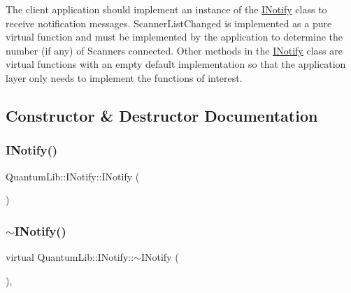 The client application should implement an instance of the \mbox{\hyperlink{class_quantum_lib_1_1_i_notify}{I\+Notify}} class to receive notification messages. Scanner\+List\+Changed is implemented as a pure virtual function and must be implemented by the application to determine the number (if any) of Scanners connected. Other methods in the \mbox{\hyperlink{class_quantum_lib_1_1_i_notify}{I\+Notify}} class are virtual functions with an empty default implementation so that the application layer only needs to implement the functions of interest. 

\subsection{Constructor \& Destructor Documentation}
\mbox{\label{class_quantum_lib_1_1_i_notify_a8605cda14fb993a16484d428d4361d00}} 
\subsubsection{\texorpdfstring{I\+Notify()}{INotify()}}
{\footnotesize\ttfamily Quantum\+Lib\+::\+I\+Notify\+::\+I\+Notify (\begin{DoxyParamCaption}{ }\end{DoxyParamCaption})\hspace{0.3cm}{\ttfamily [inline]}}

\mbox{\label{class_quantum_lib_1_1_i_notify_a9f00b489e5d31a80e63801166bb13e3e}} 
\subsubsection{\texorpdfstring{$\sim$\+I\+Notify()}{~INotify()}}
{\footnotesize\ttfamily virtual Quantum\+Lib\+::\+I\+Notify\+::$\sim$\+I\+Notify (\begin{DoxyParamCaption}{ }\end{DoxyParamCaption})\hspace{0.3cm}{\ttfamily [inline]}, {\ttfamily [virtual]}}



